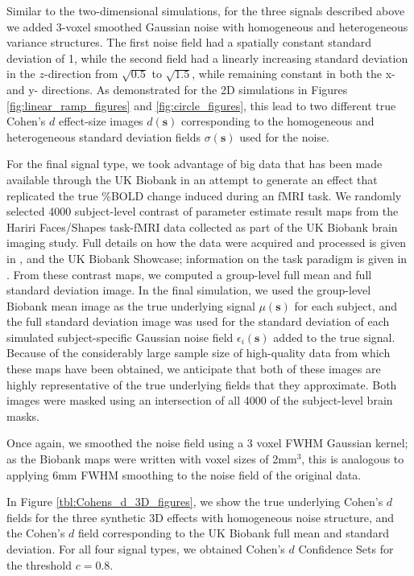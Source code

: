 Similar to the two-dimensional simulations, for the three signals described above we added 3-voxel smoothed Gaussian noise with homogeneous and heterogeneous variance structures. The first noise field had a spatially constant standard deviation of 1, while the second field had a linearly increasing standard deviation in the $z$-direction from $\sqrt{0.5}$ to $\sqrt{1.5}$, while remaining constant in both the x- and y- directions. As demonstrated for the 2D simulations in Figures \ref{fig:linear_ramp_figures} and \ref{fig:circle_figures}, this lead to two different true Cohen's $d$ effect-size images $d(\bm{s})$ corresponding to the homogeneous and heterogeneous standard deviation fields $\sigma(\bm{s})$ used for the noise.

For the final signal type, we took advantage of big data that has been made available through the UK Biobank in an attempt to generate an effect that replicated the true \%BOLD change induced during an fMRI task. We randomly selected 4000 subject-level contrast of parameter estimate result maps from the Hariri Faces/Shapes task-fMRI data collected as part of the UK Biobank brain imaging study. Full details on how the data were acquired and processed is given in \textit{\citet{Miller2016-hd}}, \textit{\citet{Alfaro-Almagro2018-ip}} and the UK Biobank Showcase; information on the task paradigm is given in \textit{\citet{Hariri2002-ns}}. From these contrast maps, we computed a group-level full mean and full standard deviation image. In the final simulation, we used the group-level Biobank mean image as the true underlying signal $\mu(\bm{s})$ for each subject, and the full standard deviation image was used for the standard deviation of each simulated subject-specific Gaussian noise field $\epsilon_{i}(\bm{s})$ added to the true signal. Because of the considerably large sample size of high-quality data from which these maps have been obtained, we anticipate that both of these images are highly representative of the true underlying fields that they approximate. Both images were masked using an intersection of all 4000 of the subject-level brain masks.

Once again, we smoothed the noise field using a 3 voxel FWHM Gaussian kernel; as the Biobank maps were written with voxel sizes of 2mm$^{3}$, this is analogous to applying 6mm FWHM smoothing to the noise field of the original data. 

In Figure \ref{tbl:Cohens_d_3D_figures}, we show the true underlying Cohen's $d$ fields for the three synthetic 3D effects with homogeneous noise structure, and the Cohen's $d$ field corresponding to the UK Biobank full mean and standard deviation. For all four signal types, we obtained Cohen's $d$ Confidence Sets for the threshold $c = 0.8$. 

